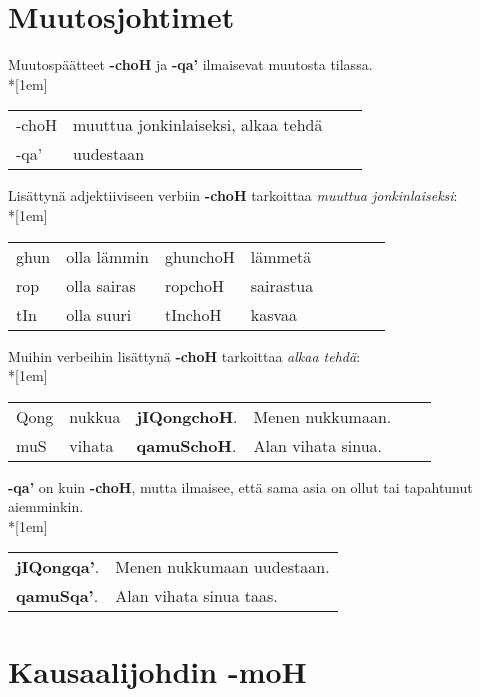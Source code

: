 \documentclass{book}
\begin{document}
\section{Muutosjohtimet}

Muutospäätteet \textbf{-choH} ja \textbf{-qa'} ilmaisevat muutosta tilassa.\\*[1em]
\begin{tabular}{Bl Il}
    -choH & muuttua jonkinlaiseksi, alkaa tehdä \\
    -qa' & uudestaan \\
\end{tabular}

Lisättynä adjektiiviseen verbiin \textbf{-choH} tarkoittaa \textit{muuttua jonkinlaiseksi}:\\*[1em]
\begin{tabular}{Bl Il | Bl Il}
    ghun & olla lämmin & ghunchoH & lämmetä \\
    rop & olla sairas & ropchoH & sairastua \\
    tIn & olla suuri & tInchoH & kasvaa \\
\end{tabular}

Muihin verbeihin lisättynä \textbf{-choH} tarkoittaa \textit{alkaa tehdä}:\\*[1em]
\begin{tabular}{Bl Il | l l}
    Qong & nukkua & \textbf{jIQongchoH}. & Menen nukkumaan. \\
    muS & vihata & \textbf{qamuSchoH}. & Alan vihata sinua. \\
\end{tabular}

\textbf{-qa'} on kuin \textbf{-choH}, mutta ilmaisee, että sama asia on ollut tai tapahtunut aiemminkin.\\*[1em]
\begin{tabular}{l l}
    \textbf{jIQongqa'}. & Menen nukkumaan uudestaan. \\
    \textbf{qamuSqa'}. & Alan vihata sinua taas. \\
\end{tabular}

\section{Kausaalijohdin -moH}
\end{document}
